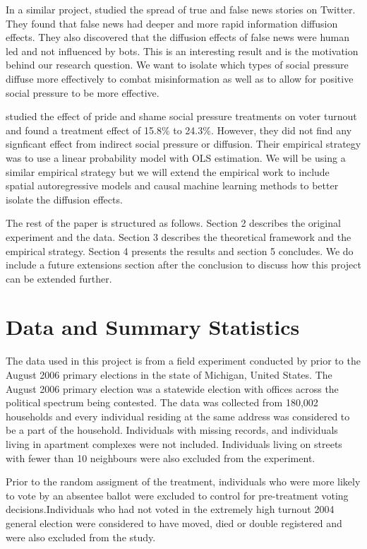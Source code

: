 \documentclass[11pt]{article}
\begin{document}
In a similar project, \cite{vosoughi_spread_2018} studied the spread of true and false news stories on Twitter. They found that false news had deeper and more rapid information diffusion effects. They also discovered that the diffusion effects of false news were human led and not influenced by bots. This is an interesting result and is the motivation behind our research question. We want to isolate which types of social pressure diffuse more effectively to combat misinformation as well as to allow for positive social pressure to be more effective. 

\cite{haenschen_social_2016} studied the effect of pride and shame social pressure treatments on voter turnout and found a treatment effect of 15.8\% to 24.3\%. However, they did not find any signficant effect from indirect social pressure or diffusion. Their empirical strategy was to use a linear probability model with OLS estimation. We will be using a similar empirical strategy but we will extend the empirical work to include spatial autoregressive models and causal machine learning methods to better isolate the diffusion effects.

The rest of the paper is structured as follows. Section 2 describes the original experiment and the data. Section 3 describes the theoretical framework and the empirical strategy. Section 4 presents the results and section 5 concludes. We do include a future extensions section after the conclusion to discuss how this project can be extended further.

\section{Data and Summary Statistics}
The data used in this project is from a field experiment conducted by \cite{gerber_social_2008} prior to the August 2006 primary elections in the state of Michigan, United States. The August 2006 primary election was a statewide election with offices across the political spectrum being contested. The data was collected from 180,002 households and every individual residing at the same address was considered to be a part of the household. Individuals with missing records, and individuals living in apartment complexes were not included. Individuals living on streets with fewer than 10 neighbours were also excluded from the experiment.

Prior to the random assigment of the treatment, individuals who were more likely to vote by an absentee ballot were excluded to control for pre-treatment voting decisions.Individuals who had not voted in the extremely high turnout 2004 general election were considered to have moved, died or double registered and were also excluded from the study.
\end{document}
